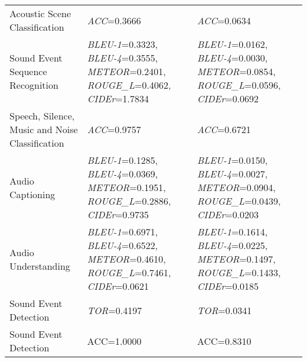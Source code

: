 \begin{longtable}[hbtp]{p{4.6cm}<{\raggedright}p{4.5cm}<{\raggedright}p{4.5cm}<{\raggedright}}
    \midrule
    Acoustic Scene Classification & \textit{ACC}=0.3666 & \textit{ACC}=0.0634\\
    Sound Event Sequence Recognition & %
\textit{BLEU-1}=0.3323, \textit{BLEU-4}=0.3555, \textit{METEOR}=0.2401, \textit{ROUGE\_L}=0.4062, \textit{CIDEr}=1.7834 & %
\textit{BLEU-1}=0.0162, \textit{BLEU-4}=0.0030, \textit{METEOR}=0.0854, \textit{ROUGE\_L}=0.0596, \textit{CIDEr}=0.0692 \\
    Speech, Silence, Music and Noise Classification & \textit{ACC}=0.9757 &	\textit{ACC}=0.6721\\
    Audio Captioning & \textit{BLEU-1}=0.1285, \textit{BLEU-4}=0.0369, \textit{METEOR}=0.1951, \textit{ROUGE\_L}=0.2886, \textit{CIDEr}=0.9735 & \textit{BLEU-1}=0.0150, \textit{BLEU-4}=0.0027, \textit{METEOR}=0.0904, \textit{ROUGE\_L}=0.0439, \textit{CIDEr}=0.0203\\
    Audio Understanding & \textit{BLEU-1}=0.6971, \textit{BLEU-4}=0.6522, \textit{METEOR}=0.4610, \textit{ROUGE\_L}=0.7461, \textit{CIDEr}=0.0621 & \textit{BLEU-1}=0.1614, \textit{BLEU-4}=0.0225, \textit{METEOR}=0.1497, \textit{ROUGE\_L}=0.1433, \textit{CIDEr}=0.0185 \\
    Sound Event Detection & \textit{TOR}=0.4197 & \textit{TOR}=0.0341\\
    Sound Event Detection & ACC=1.0000 & ACC=0.8310 \\ %
    \bottomrule

\end{longtable}
\twocolumn


